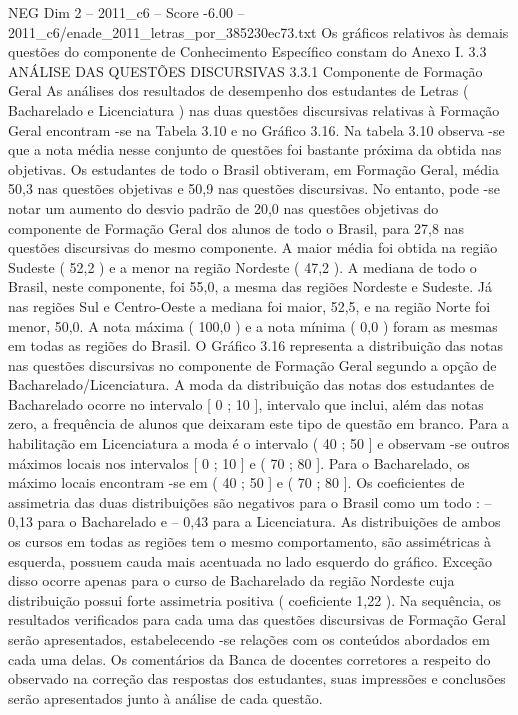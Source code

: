 \begin{textsample}{NEG Dim 2 – 2011\_c6 – Score -6.00 – 2011\_c6/enade\_2011\_letras\_por\_385230ec73.txt}
Os gráficos relativos às demais questões do componente de Conhecimento Específico constam do Anexo I. 3.3 ANÁLISE DAS QUESTÕES DISCURSIVAS 3.3.1 Componente de Formação Geral As análises dos resultados de desempenho dos estudantes de Letras ( Bacharelado e Licenciatura ) nas duas questões discursivas relativas à Formação Geral encontram -se na Tabela 3.10 e no Gráfico 3.16.
Na tabela 3.10 observa -se que a nota média nesse conjunto de questões foi bastante próxima da obtida nas objetivas.
Os estudantes de todo o Brasil obtiveram, em Formação Geral, média 50,3 nas questões objetivas e 50,9 nas questões discursivas.
No entanto, pode -se notar um aumento do desvio padrão de 20,0 nas questões objetivas do componente de Formação Geral dos alunos de todo o Brasil, para 27,8 nas questões discursivas do mesmo componente.
A maior média foi obtida na região Sudeste ( 52,2 ) e a menor na região Nordeste ( 47,2 ).
A mediana de todo o Brasil, neste componente, foi 55,0, a mesma das regiões Nordeste e Sudeste.
Já nas regiões Sul e Centro-Oeste a mediana foi maior, 52,5, e na região Norte foi menor, 50,0.
A nota máxima ( 100,0 ) e a nota mínima ( 0,0 ) foram as mesmas em todas as regiões do Brasil.
O Gráfico 3.16 representa a distribuição das notas nas questões discursivas no componente de Formação Geral segundo a opção de Bacharelado/Licenciatura.
A moda da distribuição das notas dos estudantes de Bacharelado ocorre no intervalo [ 0 ; 10 ], intervalo que inclui, além das notas zero, a frequência de alunos que deixaram este tipo de questão em branco.
Para a habilitação em Licenciatura a moda é o intervalo ( 40 ; 50 ] e observam -se outros máximos locais nos intervalos [ 0 ; 10 ] e ( 70 ; 80 ].
Para o Bacharelado, os máximo locais encontram -se em ( 40 ; 50 ] e ( 70 ; 80 ].
Os coeficientes de assimetria das duas distribuições são negativos para o Brasil como um todo : – 0,13 para o Bacharelado e – 0,43 para a Licenciatura.
As distribuições de ambos os cursos em todas as regiões tem o mesmo comportamento, são assimétricas à esquerda, possuem cauda mais acentuada no lado esquerdo do gráfico.
Exceção disso ocorre apenas para o curso de Bacharelado da região Nordeste cuja distribuição possui forte assimetria positiva ( coeficiente 1,22 ).
Na sequência, os resultados verificados para cada uma das questões discursivas de Formação Geral serão apresentados, estabelecendo -se relações com os conteúdos abordados em cada uma delas.
Os comentários da Banca de docentes corretores a respeito do observado na correção das respostas dos estudantes, suas impressões e conclusões serão apresentados junto à análise de cada questão.

\end{textsample}
